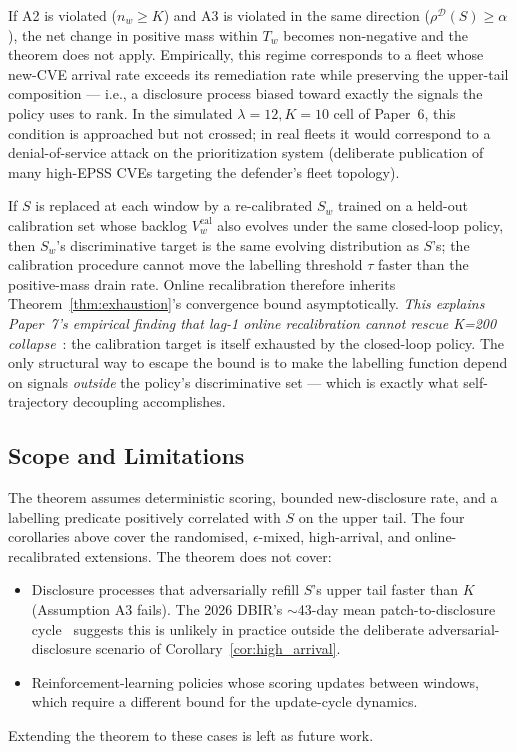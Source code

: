 \begin{corollary}
\label{cor:high_arrival}
If A2 is violated ($n_w \geq K$) and A3 is violated in the same
direction ($\rho^{\mathcal{D}}(S) \geq \alpha$), the net change in
positive mass within $T_w$ becomes non-negative and the theorem does
not apply. Empirically, this regime corresponds to a fleet whose
new-CVE arrival rate exceeds its remediation rate while preserving
the upper-tail composition --- i.e., a disclosure process biased
toward exactly the signals the policy uses to rank. In the simulated
$\lambda = 12, K = 10$ cell of Paper~6, this condition is approached
but not crossed; in real fleets it would correspond to a denial-of-service
attack on the prioritization system (deliberate publication of many
high-EPSS CVEs targeting the defender's fleet topology).
\end{corollary}

\begin{corollary}
\label{cor:calibration}
If $S$ is replaced at each window by a re-calibrated $S_w$ trained on
a held-out calibration set whose backlog $V_w^{\text{cal}}$ also evolves
under the same closed-loop policy, then $S_w$'s discriminative target
is the same evolving distribution as $S$'s; the calibration procedure
cannot move the labelling threshold $\tau$ faster than the
positive-mass drain rate. Online recalibration therefore inherits
Theorem~\ref{thm:exhaustion}'s convergence bound asymptotically.
\emph{This explains Paper~7's empirical finding that lag-1 online
recalibration cannot rescue K=200 collapse}~\cite{paper7online}:
the calibration target is itself exhausted by the closed-loop policy.
The only structural way to escape the bound is to make the labelling
function depend on signals \emph{outside} the policy's discriminative
set --- which is exactly what self-trajectory decoupling accomplishes.
\end{corollary}

\subsection{Scope and Limitations}

The theorem assumes deterministic scoring, bounded new-disclosure rate,
and a labelling predicate positively correlated with $S$ on the upper
tail. The four corollaries above cover the randomised, $\epsilon$-mixed,
high-arrival, and online-recalibrated extensions. The theorem does
not cover:
\begin{itemize}
\item Disclosure processes that adversarially refill $S$'s upper tail
faster than $K$ (Assumption A3 fails). The 2026 DBIR's $\sim$43-day mean
patch-to-disclosure cycle~\cite{verizon2026dbir} suggests this is
unlikely in practice
outside the deliberate adversarial-disclosure scenario of
Corollary~\ref{cor:high_arrival}.
\item Reinforcement-learning policies whose scoring updates between
windows, which require a different bound for the update-cycle dynamics.
\end{itemize}
Extending the theorem to these cases is left as future work.
